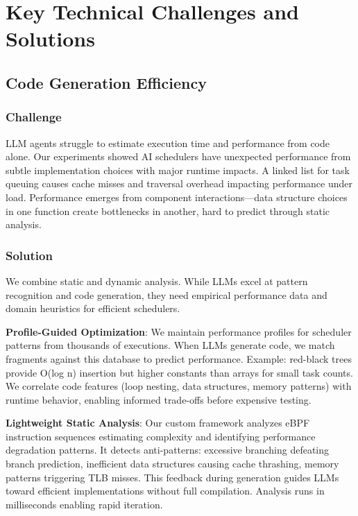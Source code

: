 \section{Key Technical Challenges and Solutions}

\subsection{Code Generation Efficiency}

\subsubsection{Challenge}
LLM agents struggle to estimate execution time and performance from code alone. Our experiments showed AI schedulers have unexpected performance from subtle implementation choices with major runtime impacts. A linked list for task queuing causes cache misses and traversal overhead impacting performance under load. Performance emerges from component interactions—data structure choices in one function create bottlenecks in another, hard to predict through static analysis.

\subsubsection{Solution}
We combine static and dynamic analysis. While LLMs excel at pattern recognition and code generation, they need empirical performance data and domain heuristics for efficient schedulers.

\textbf{Profile-Guided Optimization}: We maintain performance profiles for scheduler patterns from thousands of executions. When LLMs generate code, we match fragments against this database to predict performance. Example: red-black trees provide O(log n) insertion but higher constants than arrays for small task counts. We correlate code features (loop nesting, data structures, memory patterns) with runtime behavior, enabling informed trade-offs before expensive testing.

\textbf{Lightweight Static Analysis}: Our custom framework analyzes eBPF instruction sequences estimating complexity and identifying performance degradation patterns. It detects anti-patterns: excessive branching defeating branch prediction, inefficient data structures causing cache thrashing, memory patterns triggering TLB misses. This feedback during generation guides LLMs toward efficient implementations without full compilation. Analysis runs in milliseconds enabling rapid iteration.

